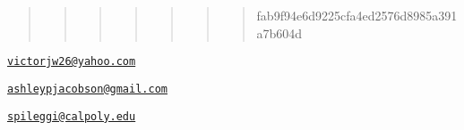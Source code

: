 

\begin{quote}
\begin{quote}
\begin{quote}
\begin{quote}
\begin{quote}
\begin{quote}
\begin{quote}
fab9f94e6d9225cfa4ed2576d8985a391a7b604d
\end{quote}
\end{quote}
\end{quote}
\end{quote}
\end{quote}
\end{quote}
\end{quote}


\address{%
Victor Wilson\\
California Polytechnic State University, San Luis Obispo - Statistics
Department\\
\\
}
\href{mailto:victorjw26@yahoo.com}{\nolinkurl{victorjw26@yahoo.com}}

\address{%
Ashley Jacobson\\
California Polytechnic State University, San Luis Obispo - Statistics
Department\\
\\
}
\href{mailto:ashleypjacobson@gmail.com}{\nolinkurl{ashleypjacobson@gmail.com}}

\address{%
Shannon Pileggi\\
California Polytechnic State University, San Luis Obispo - Statistics
Department\\
\\
}
\href{mailto:spileggi@calpoly.edu}{\nolinkurl{spileggi@calpoly.edu}}

